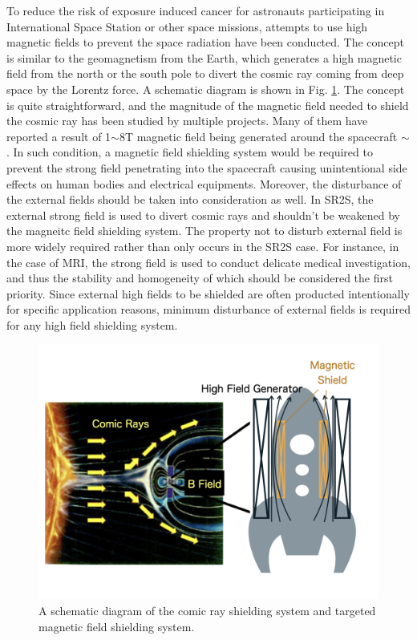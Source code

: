 To reduce the risk of exposure induced cancer for astronauts participating in International Space Station or other space missions,
attempts to use high magnetic fields to prevent the space radiation have been conducted.
The concept is similar to the geomagnetism from the Earth,
which generates a high magnetic field from the north or the south pole to divert the cosmic ray coming from deep space by the Lorentz force.
A schematic diagram is shown in Fig. \ref{fig:SR2S}.
The concept is quite straightforward,
and the magnitude of the magnetic field needed to shield the cosmic ray has been studied by multiple projects.
Many of them have reported a result of 1$\sim$8T magnetic field being generated around the spacecraft \cite{1_1_2}$\sim$\cite{1_1_5}.
In such condition, a magnetic field shielding system would be required to prevent the strong field penetrating into the spacecraft
causing unintentional side effects on human bodies and electrical equipments.
Moreover, the disturbance of the external fields should be taken into consideration as well.
In SR2S, the external strong field is used to divert cosmic rays and shouldn't be weakened by the magneitc field shielding system.
The property not to disturb external field is more widely required rather than only occurs in the SR2S case.
For instance, in the case of MRI, the strong field is used to conduct delicate medical investigation,
and thus the stability and homogeneity of which should be considered the first priority.
Since external high fields to be shielded are often producted intentionally for specific application reasons,
minimum disturbance of external fields is required for any high field shielding system.
\begin{figure}[H]
  \includegraphics[width=18cm, bb=9 9 900 700]{./section1Introduction/solar.png}
  \caption{A schematic diagram of the comic ray shielding system and targeted magnetic field shielding system. }
  \label{fig:SR2S}
\end{figure}
